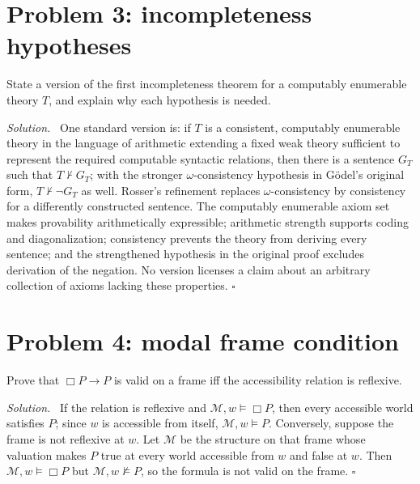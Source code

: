 \documentclass[11pt,oneside,openany]{book}
\theoremstyle{definition}
\theoremstyle{plain}
\theoremstyle{remark}
\newenvironment{solution}{\par\noindent\textit{Solution.}\ }{\hfill$\square$\par}
\newcommand{\entails}{\models}
\newcommand{\notentails}{\not\models}
\newcommand{\notderives}{\not\vdash}
\begin{document}
\section{Problem 3: incompleteness hypotheses}
\label{sec:qualifying-problems-03}
\label{prob:incompleteness}

State a version of the first incompleteness theorem for a computably enumerable
theory \(T\), and explain why each hypothesis is needed.

\begin{solution}
One standard version is: if \(T\) is a consistent, computably enumerable
theory in the language of arithmetic extending a fixed weak theory sufficient
to represent the required computable syntactic relations, then there is a
sentence \(G_T\) such that \(T\notderives G_T\); with the stronger
\(\omega\)-consistency hypothesis in G\"odel's original form,
\(T\notderives\neg G_T\) as well.  Rosser's refinement replaces
\(\omega\)-consistency by consistency for a differently constructed sentence.
The computably enumerable axiom set makes provability arithmetically expressible;
arithmetic strength supports coding and diagonalization; consistency prevents
the theory from deriving every sentence; and the strengthened hypothesis in
the original proof excludes derivation of the negation.  No version licenses a
claim about an arbitrary collection of axioms lacking these properties.
\end{solution}

\section{Problem 4: modal frame condition}
\label{sec:qualifying-problems-04}
\label{prob:modal-frame}

Prove that \(\Box P\to P\) is valid on a frame iff the accessibility relation is
reflexive.

\begin{solution}
If the relation is reflexive and
\(\mathcal M,w\entails\Box P\), then every accessible world satisfies \(P\);
since \(w\) is accessible from itself, \(\mathcal M,w\entails P\).  Conversely,
suppose the frame is not reflexive at \(w\).  Let \(\mathcal M\) be the
structure on that frame whose valuation makes \(P\) true at every world
accessible from \(w\) and false at \(w\).  Then
\(\mathcal M,w\entails\Box P\) but \(\mathcal M,w\notentails P\), so the
formula is not valid on the frame.
\end{solution}
\end{document}

